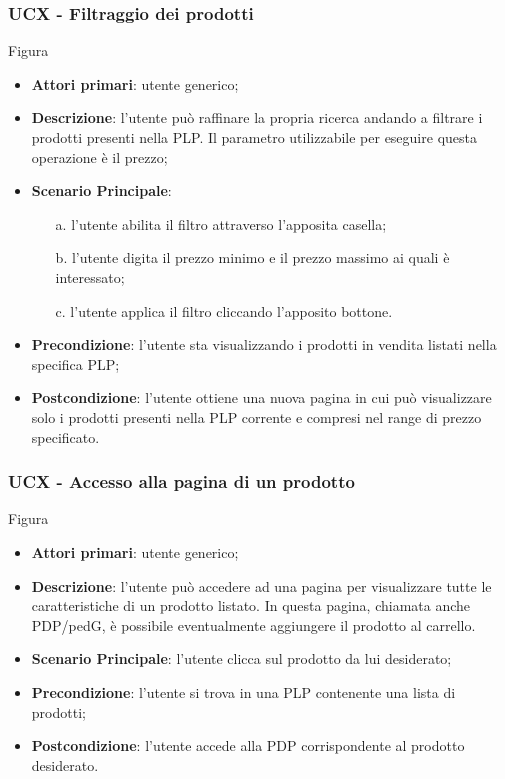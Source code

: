 \subsubsection{UCX - Filtraggio dei prodotti}
Figura \\
\begin{itemize}
\item \textbf{Attori primari}: utente generico;
\item \textbf{Descrizione}: l'utente può raffinare la propria ricerca andando a filtrare i prodotti presenti nella PLP. Il parametro utilizzabile per eseguire questa operazione è il prezzo;
\item \textbf{Scenario Principale}:
\begin{enumerate}
\item[a.] l'utente abilita il filtro attraverso l'apposita casella;
\item[b.] l'utente digita il prezzo minimo e il prezzo massimo ai quali è interessato;
\item[c.] l'utente applica il filtro cliccando l'apposito bottone.
\end{enumerate}
\item \textbf{Precondizione}: l'utente sta visualizzando i prodotti in vendita listati nella specifica PLP;
\item \textbf{Postcondizione}: l'utente ottiene una nuova pagina in cui può visualizzare solo i prodotti presenti nella PLP corrente e compresi nel range di prezzo specificato.
\end{itemize}
\subsubsection{UCX - Accesso alla pagina di un prodotto}
Figura \\
\begin{itemize}
\item \textbf{Attori primari}: utente generico;
\item \textbf{Descrizione}: l'utente può accedere ad una pagina per visualizzare tutte le caratteristiche di un prodotto listato. In questa pagina, chiamata anche PDP/ped{G}, è possibile eventualmente aggiungere il prodotto al carrello.
\item \textbf{Scenario Principale}: l'utente clicca sul prodotto da lui desiderato;
\item \textbf{Precondizione}: l'utente si trova in una PLP contenente una lista di prodotti;
\item \textbf{Postcondizione}: l'utente accede alla PDP corrispondente al prodotto desiderato.
\end{itemize}